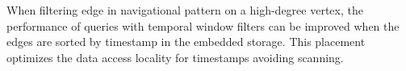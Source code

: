 
When filtering edge in navigational pattern on a high-degree vertex, the
performance of queries with temporal window filters can be improved when the
edges are sorted by timestamp in the embedded storage. This placement optimizes
the data access locality for timestamps avoiding scanning.


